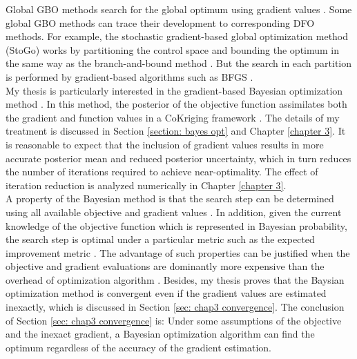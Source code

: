 Global GBO methods search for the global optimum using gradient values \cite{opt via sim review, nonlinear program}.
Some global GBO methods can trace their development to corresponding DFO methods.
For example, the stochastic gradient-based global optimization method (StoGo) 
\cite{stogo 1, stogo 2} works by partitioning the control space and bounding the optimum in the same way 
as the branch-and-bound method \cite{Branch and Bound}. But the search in each partition is performed
by gradient-based algorithms such as BFGS \cite{quasiNewton}.\\

My thesis is particularly interested in the gradient-based Bayesian optimization method \cite{coKriging}.
In this method, the posterior of the objective function assimilates both the gradient 
and function values in a CoKriging framework \cite{derivative RKHS, coKriging}.
The details of my treatment is discussed in Section \ref{section: bayes opt} and
Chapter \ref{chapter 3}.
It is reasonable to expect that 
the inclusion of gradient values results in more accurate posterior mean and 
reduced posterior uncertainty, which in turn reduces the number of iterations required to
achieve near-optimality. The effect of iteration reduction 
is analyzed numerically in Chapter \ref{chapter 3}.\\

A property of the Bayesian method is that the search step can be determined using all 
available objective and gradient values \cite{practical Bayesian, jones1998}. In addition, 
given the current knowledge of the objective function which is represented in Bayesian probability,
the search step is optimal under a particular metric such as the expected improvement metric
\cite{practical Bayesian, jones1998}. 
The advantage of such properties can be justified
when the objective and gradient evaluations
are dominantly more expensive than the overhead of 
optimization algorithm \cite{practical Bayesian}. Besides, my thesis proves that the
Baysian optimization method is convergent even if the gradient values are estimated
inexactly, which is discussed in Section \ref{sec: chap3 convergence}.
The conclusion of Section \ref{sec: chap3 convergence} is: Under some assumptions of the objective and the inexact gradient, 
a Bayesian optimization algorithm can find the optimum regardless of the accuracy of the gradient estimation.\\

